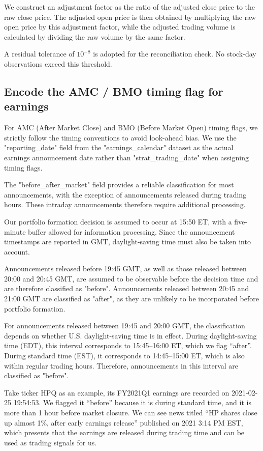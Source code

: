 \documentclass[12pt]{article}
\begin{document}
We construct an adjustment factor as the ratio of the adjusted close price to the raw close price. The adjusted open price is then obtained by multiplying the raw open price by this adjustment factor, while the adjusted trading volume is calculated by dividing the raw volume by the same factor.

A residual tolerance of  $10^{-8}$ is adopted for the reconciliation check. No stock-day observations exceed this threshold.

\subsection{Encode the AMC / BMO timing flag for earnings   }
For AMC (After Market Close) and BMO (Before Market Open) timing flags, we strictly follow the timing conventions to avoid look-ahead bias. We use the "reporting\_date" field from the "earnings\_calendar" dataset as the actual earnings announcement date rather than "strat\_trading\_date" when assigning timing flags.

The "before\_after\_market" field provides a reliable classification for most announcements, with the exception of announcements released during trading hours. These intraday announcements therefore require additional processing.

Our portfolio formation decision is assumed to occur at 15:50 ET, with a five-minute buffer allowed for information processing. Since the announcement timestamps are reported in GMT, daylight-saving time must also be taken into account.

Announcements released before 19:45 GMT, as well as those released between 20:00 and 20:45 GMT, are assumed to be observable before the decision time and are therefore classified as "before". Announcements released between 20:45 and 21:00 GMT are classified as "after", as they are unlikely to be incorporated before portfolio formation.

For announcements released between 19:45 and 20:00 GMT, the classification depends on whether U.S. daylight-saving time is in effect. During daylight-saving time (EDT), this interval corresponds to 15:45–16:00 ET, which we flag “after”. During standard time (EST), it corresponds to 14:45–15:00 ET, which is also within regular trading hours. Therefore, announcements in this interval are classified as "before".

Take ticker HPQ as an example, its FY2021Q1 earnings are recorded on 2021-02-25 19:54:53. We flagged it “before” because it is during standard time, and it is more than 1 hour before market closure. We can see news titled “HP shares close up almost 1\%, after early earnings release” published on 2021 3:14 PM EST, which presents that the earnings are released during trading time and can be used as trading signals for us.
\end{document}
